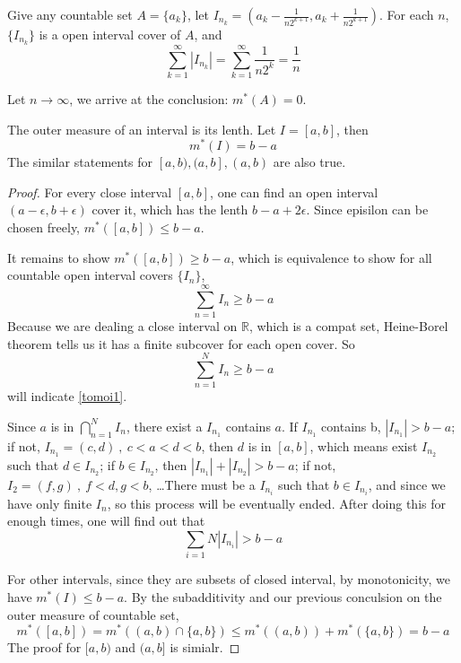 \documentclass[lang=en, 12pt]{elegantbook}
\newcommand{\RR}{\mathbb{R}}
\begin{document}
            \begin{example}
                Give any countable set $ A = \{a_k\}$, let $I_{n_k} = (a_k-\frac{1}{n2^{k+1}},a_k+\frac{1}{n2^{k+1}})$. For each $n$, $\{I_{n_k}\}$
            is a open interval cover of $A$, and 
                $$\sum_{k=1}^{\infty}|I_{n_k}|=\sum_{k=1}^{\infty}\frac{1}{n2^k}=\frac{1}{n}$$ \par
                Let $n \to \infty$, we arrive at the conclusion: $m^*(A) = 0$.
            \end{example}
            \begin{proposition}
                The outer measure of an interval is its lenth. Let $I = [a,b]$, then $$m^*(I) = b-a $$
                The similar statements for $[a,b), (a,b], (a,b)$ are also true.\par
                
            \end{proposition}
            \begin{proof}
                For every close interval $[a,b]$, one can find an open interval $(a-\epsilon,b+\epsilon)$ cover it, which has the lenth 
            $b-a+2\epsilon$. Since episilon can be chosen freely, $m^*([a,b]) \leq b-a$. \par
                It remains to show $m^*([a,b]) \geq b-a$, which is
            equivalence to show for all countable open interval covers $\{I_n\}$, 
            \begin{equation}
                \sum_{n=1}^{\infty}I_n \geq b-a \label{tomoi1}
            \end{equation}
                Because we are dealing a
            close interval on $\RR$, which is a compat set, Heine-Borel theorem tells us it has a finite subcover for each open cover. So 
            \begin{equation}
                \sum_{n=1}^{N}I_n \geq b-a \label{tomoi2}
            \end{equation}
            will indicate \eqref{tomoi1}. \par
                Since $a$ is in $\bigcap_{n=1}^{N} I_n$, there exist a $I_{n_1}$ contains $a$. If $I_{n_1}$ contains b, $|I_{n_1}|>b-a$;
            if not, $I_{n_1} = (c,d) \ , \ c<a<d<b$, then $d$ is in $[a,b]$, which means exist  $I_{n_2}$ such that $d \in I_{n_2}$; if
            $b \in I_{n_2}$, then $|I_{n_1}|+|I_{n_2}|>b-a$; if not, $I_{2} = (f,g) \ , \ f<d,g<b$, \dots There must be a $I_{n_i}$ such that 
            $b \in I_{n_i}$, and since we have only finite $I_n$, so this process will be eventually ended. After doing this for enough times,
            one will find out that 
            $$\sum_{i=1}{N}|I_{n_i}|>b-a$$ \par
                For other intervals, since they are subsets of closed interval, by monotonicity, we have $m^*(I)\leq b-a$. By the subadditivity
            and our previous conculsion on the outer measure of countable set, $$m^*([a,b])=m^*((a,b)\cap \{a,b\})\leq m^*((a,b))+m^*(\{a,b\})=b-a$$
            The proof for $[a,b)$ and $(a,b]$ is simialr.
            \end{proof}
\end{document}
